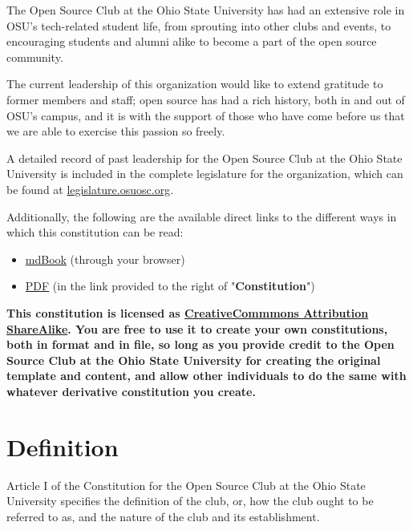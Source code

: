 \documentclass[12pt,letterpaper]{article}
\begin{document}
\begin{hangparas}{0.5in}{1}
  The Open Source Club at the Ohio State University has had an extensive role in OSU's
  tech-related student life, from sprouting into other clubs and events, to encouraging
  students and alumni alike to become a part of the open source community.

  The current leadership of this organization would like to extend gratitude to former
  members and staff; open source has had a rich history, both in and out of OSU's campus,
  and it is with the support of those who have come before us that we are able to exercise
  this passion so freely.

  A detailed record of past leadership for the Open Source Club at the Ohio State University
  is included in the complete legislature for the organization, which can be found at
  \href{https://legislature.osuosc.org}{legislature.osuosc.org}.

  Additionally, the following are the available direct links to the different ways in which
  this constitution can be read:

  \begin{itemize}
    \item \href{https://legislature.osuosc.org/constitution/preamble.html}{mdBook} (through
      your browser)
    \item \href{https://activities.osu.edu/involvement/student_organizations/find_a_student_org?i=1042}{PDF} (in the link provided to the right of "\textbf{Constitution}")
  \end{itemize}

  \textbf{This constitution is licensed as \href{https://creativecommons.org/licenses/by-sa/4.0/deed.en}{CreativeCommmons Attribution ShareAlike}. You are free to use it to create your own
  constitutions, both in format and in file, so long as you provide credit to the Open Source
Club at the Ohio State University for creating the original template and content, and allow
other individuals to do the same with whatever derivative constitution you create.}
\end{hangparas}

\section{Definition}

Article I of the Constitution for the Open Source Club at the Ohio State University specifies
the definition of the club, or, how the club ought to be referred to as, and the nature of the
club and its establishment.
\end{document}
